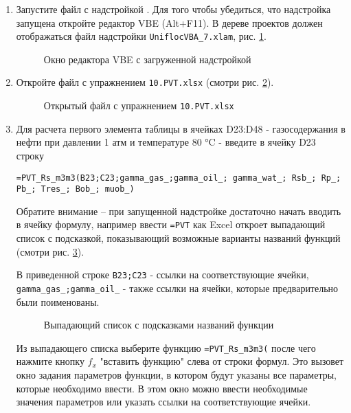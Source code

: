 \begin{enumerate}
	\item Запустите файл с надстройкой \unf. Для того чтобы убедиться, что надстройка запущена откройте редактор VBE (Alt+F11). В дереве проектов должен отображаться файл надстройки \texttt{UniflocVBA_7.xlam}, рис. \ref{ris:VBE_empty}.
	
	\begin{figure}[h!]
		\caption{Окно редактора VBE с загруженной надстройкой \unf}
		\label{ris:VBE_empty}
	\end{figure}

	\item Откройте файл с упражнением \texttt{10.PVT.xlsx} (смотри рис. \ref{ris:Ex10_1}).
	
	\begin{figure}[h!]
		\center{\texttt{[image: Ex10\_1]}}
		\caption{Открытый файл с упражнением \texttt{10.PVT.xlsx}}
		\label{ris:Ex10_1}
	\end{figure}
	
	\item Для расчета первого элемента таблицы в ячейках D23:D48 - газосодержания в нефти при давлении 1 атм и температуре 80 °C - введите в ячейку D23 строку
	
	{ \small  \texttt{=PVT\_Rs\_m3m3(B23;C23;gamma\_gas\_;gamma\_oil\_; gamma\_wat\_; Rsb\_; Rp\_; Pb\_; Tres\_; Bob\_; muob\_)}}
	
	Обратите внимание -- при запущенной надстройке достаточно начать вводить в ячейку формулу, например ввести \texttt{=PVT} как Excel откроет выпадающий список с подсказкой, показывающий возможные варианты названий функций (смотри рис. \ref{ris:Ex10_2}). 
	
	В приведенной строке \texttt{B23;C23} - ссылки на соответствующие ячейки,  \texttt{gamma\_gas\_;gamma\_oil\_} - также ссылки на ячейки, которые предварительно были поименованы. 

	\begin{figure}[h!]
		\center{\texttt{[image: Ex10\_2]}}
		\caption{Выпадающий список с подсказками названий функции}
		\label{ris:Ex10_2}
	\end{figure}

	Из выпадающего списка выберите функцию \texttt{=PVT\_Rs\_m3m3(} после чего нажмите кнопку $f_x$ "вставить функцию"  слева от строки формул. Это вызовет окно задания параметров функции, в котором будут указаны все параметры, которые необходимо ввести. В этом окно можно ввести необходимые значения параметров или указать ссылки на соответствующие ячейки.


\end{enumerate}
